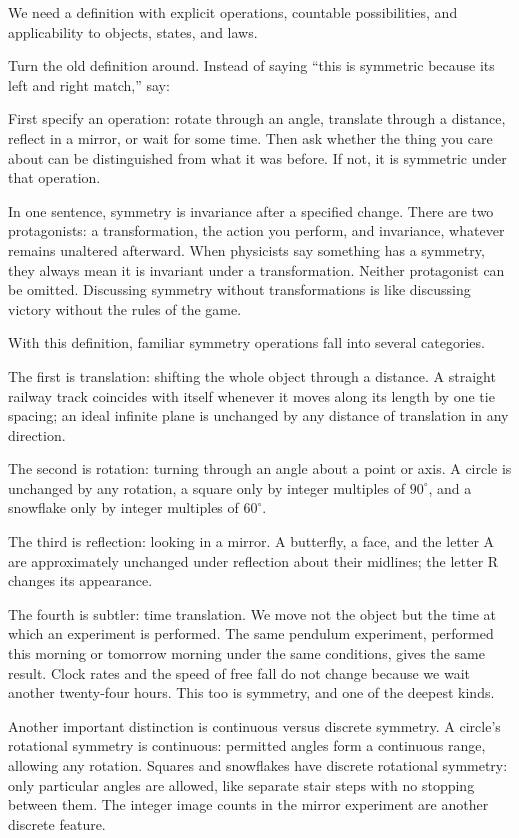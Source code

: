 We need a definition with explicit operations, countable possibilities, and applicability to objects, states, and laws.


Turn the old definition around. Instead of saying ``this is symmetric because its left and right match,'' say:

First specify an operation: rotate through an angle, translate through a distance, reflect in a mirror, or wait for some time. Then ask whether the thing you care about can be distinguished from what it was before. If not, it is symmetric under that operation.

In one sentence, symmetry is invariance after a specified change. There are two protagonists: a transformation, the action you perform, and invariance, whatever remains unaltered afterward. When physicists say something has a symmetry, they always mean it is invariant under a transformation. Neither protagonist can be omitted. Discussing symmetry without transformations is like discussing victory without the rules of the game.

With this definition, familiar symmetry operations fall into several categories.

The first is translation: shifting the whole object through a distance. A straight railway track coincides with itself whenever it moves along its length by one tie spacing; an ideal infinite plane is unchanged by any distance of translation in any direction.

The second is rotation: turning through an angle about a point or axis. A circle is unchanged by any rotation, a square only by integer multiples of \(90^\circ\), and a snowflake only by integer multiples of \(60^\circ\).

The third is reflection: looking in a mirror. A butterfly, a face, and the letter A are approximately unchanged under reflection about their midlines; the letter R changes its appearance.

The fourth is subtler: time translation. We move not the object but the time at which an experiment is performed. The same pendulum experiment, performed this morning or tomorrow morning under the same conditions, gives the same result. Clock rates and the speed of free fall do not change because we wait another twenty-four hours. This too is symmetry, and one of the deepest kinds.

Another important distinction is continuous versus discrete symmetry. A circle's rotational symmetry is continuous: permitted angles form a continuous range, allowing any rotation. Squares and snowflakes have discrete rotational symmetry: only particular angles are allowed, like separate stair steps with no stopping between them. The integer image counts in the mirror experiment are another discrete feature.

